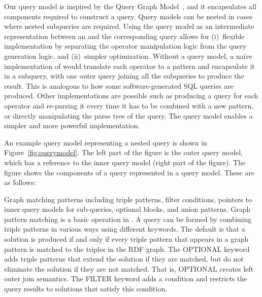 
\vspace*{-3pt}
Our query model is inspired by the Query Graph Model~\cite{Pirahesh:1992}, and it
encapsulates all components required to construct a \sparql query. 
Query models can be nested in cases where nested subqueries are required.
Using the query model as an intermediate representation between an \rdfframe and the corresponding \sparql query allows for 
(i)~flexible implementation by separating the operator manipulation logic from the query generation logic, and (ii)~simpler optimization.
Without a query model, a naive implementation of \rdfframes would 
translate each operator to a \sparql pattern and encapsulate it in a subquery,
with one outer query joining all the subqueries to produce the result.
This is analogous to how some software-generated SQL queries are produced.
Other implementations are possible such as producing a \sparql query for
each operator and re-parsing it every time it has to be combined with a new pattern,
or directly manipulating the parse tree of the query.
The query model enables a simpler and more powerful implementation.

An example query model representing a nested \sparql query is shown in Figure~\ref{fig:querymodel}.
The left part of the figure is the outer query model, which has a reference to the inner query model (right part of the figure). 
The figure shows the components of a \sparql query represented in a query model.
These are as follows:
\squishlist

\item
Graph matching patterns including triple patterns, filter conditions, pointers to inner query models for sub-queries, optional blocks, and union patterns. Graph pattern matching is a basic operation in \sparql.
A \sparql query can be formed by combining triple patterns in various ways using different keywords.
The default is that a solution is produced if and only if
every triple pattern that appears in a graph pattern is matched to the triples in the RDF graph.
The OPTIONAL keyword adds triple patterns that extend the solution if they are matched, but do not eliminate the solution if they are not matched.
That is, OPTIONAL creates left outer join semantics.
The FILTER keyword adds a condition and restricts the query results to solutions that satisfy this condition.


